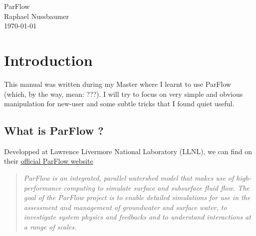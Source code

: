 \documentclass[11pt,a4paper]{report}
\begin{document}
\begin{center}
{\huge ParFlow}\\
{\large Raphael Nussbaumer}\\
\today\\
\end{center}

\tableofcontents

\chapter{Introduction}
This manual was written during my Master where I learnt to use ParFlow (which, by the way, mean: ???). I will try to focus on very simple and obvious manipulation for new-user and some subtle tricks that I found quiet useful.

\section{What is ParFlow ?}
Developped at Lawrence Livermore National
Laboratory (LLNL), we can find on their \href{http://computation.llnl.gov/casc/parflow/parflow_home.html}{official ParFlow website}
\begin{quote}\it 
ParFlow is an integrated, parallel watershed model that makes use of high-performance computing to simulate surface and subsurface fluid flow. The goal of the ParFlow project is to enable detailed simulations for use in the assessment and management of groundwater and surface water, to investigate system physics and feedbacks and to understand interactions at a range of scales.
\end{quote}
\end{document}
